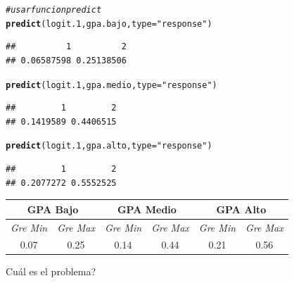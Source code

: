 \documentclass[onesided]{article}\usepackage[]{graphicx}\usepackage[]{color}
\makeatletter
\newcommand{\hlstr}[1]{\textcolor[rgb]{0.192,0.494,0.8}{#1}}%
\newcommand{\hlcom}[1]{\textcolor[rgb]{0.678,0.584,0.686}{\textit{#1}}}%
\newcommand{\hlstd}[1]{\textcolor[rgb]{0.345,0.345,0.345}{#1}}%
\newcommand{\hlkwc}[1]{\textcolor[rgb]{0.333,0.667,0.333}{#1}}%
\newcommand{\hlkwd}[1]{\textcolor[rgb]{0.737,0.353,0.396}{\textbf{#1}}}%
\newenvironment{kframe}{%
 \def\at@end@of@kframe{}%
 \ifinner\ifhmode%
  \def\at@end@of@kframe{\end{minipage}}%
  \begin{minipage}{\columnwidth}%
 \fi\fi%
 \def\FrameCommand##1{\hskip\@totalleftmargin \hskip-\fboxsep
 \colorbox{shadecolor}{##1}\hskip-\fboxsep
     \hskip-\linewidth \hskip-\@totalleftmargin \hskip\columnwidth}%
 \MakeFramed {\advance\hsize-\width
   \@totalleftmargin\z@ \linewidth\hsize
   \@setminipage}}%
 {\par\unskip\endMakeFramed%
 \at@end@of@kframe}
\newenvironment{knitrout}{}{} %
\makeatother
\begin{document}
\begin{knitrout}
\color{fgcolor}\begin{kframe}
\begin{alltt}
\hlcom{# usar funcion predict}
\hlkwd{predict}\hlstd{(logit.1, gpa.bajo,} \hlkwc{type}\hlstd{=}\hlstr{"response"}\hlstd{)}
\end{alltt}
\begin{verbatim}
##          1          2 
## 0.06587598 0.25138506
\end{verbatim}
\begin{alltt}
\hlkwd{predict}\hlstd{(logit.1, gpa.medio,} \hlkwc{type}\hlstd{=}\hlstr{"response"}\hlstd{)}
\end{alltt}
\begin{verbatim}
##         1         2 
## 0.1419589 0.4406515
\end{verbatim}
\begin{alltt}
\hlkwd{predict}\hlstd{(logit.1, gpa.alto,} \hlkwc{type}\hlstd{=}\hlstr{"response"}\hlstd{)}
\end{alltt}
\begin{verbatim}
##         1         2 
## 0.2077272 0.5552525
\end{verbatim}
\end{kframe}
\end{knitrout}



\begin{table}[H]
\begin{tabular}{|c|c|c|c|c|c|}
\hline
\multicolumn{2}{|c|}{\textbf{GPA Bajo}} & \multicolumn{2}{c|}{\textbf{GPA Medio}} & \multicolumn{2}{c|}{\textbf{GPA Alto}} \\ \hline
\textit{Gre Min}   & \textit{Gre Max}   & \textit{Gre Min}   & \textit{Gre Max}   & \textit{Gre Min}   & \textit{Gre Max}  \\ \hline
0.07 & 0.25 &                    
0.14 & 0.44 &                    
0.21 & 0.56 \\ \hline
\end{tabular}
\end{table}


{\color{red}Cu\'al es el problema?}
\end{document}
